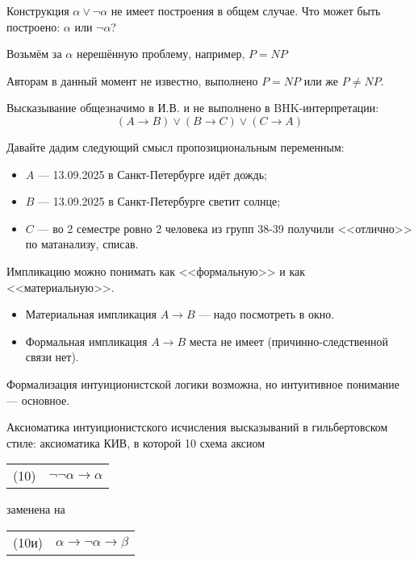 
Конструкция $\alpha\vee\neg\alpha$ не имеет построения в общем случае.
Что может быть построено: $\alpha$ или $\neg\alpha$?

Возьмём за $\alpha$ нерешённую проблему, например, $P = NP$

Авторам в данный момент не известно, выполнено $P = NP$ или же $P \ne NP$.


Высказывание общезначимо в И.В. и не выполнено в BHK-интерпретации:
$$(A \rightarrow B) \vee (B \rightarrow C) \vee (C \rightarrow A)$$

Давайте дадим следующий смысл пропозициональным переменным:
\begin{itemize}
\item $A$ --- 13.09.2025 в Санкт-Петербурге идёт дождь;
\item $B$ --- 13.09.2025 в Санкт-Петербурге светит солнце;
\item $C$ --- во 2 семестре ровно 2 человека из групп 38-39 получили <<отлично>> по матанализу, списав.
\end{itemize}

Импликацию можно понимать как <<формальную>> и как <<материальную>>.
\begin{itemize}
\item Материальная импликация $A\rightarrow B$ --- надо посмотреть в окно.

\item Формальная импликация $A\rightarrow B$ места не имеет (причинно-следственной связи нет).
\end{itemize}

Формализация интуиционистской логики возможна, но интуитивное понимание --- основное.

 Аксиоматика интуиционистского исчисления высказываний в гильбертовском стиле: 
аксиоматика КИВ, в которой 10 схема аксиом

\begin{center}\begin{tabular}{ll}
(10) & $\neg \neg \alpha \rightarrow \alpha$
\end{tabular}\end{center}

заменена на 

\begin{center}\begin{tabular}{ll}
(10и) & $\alpha \rightarrow \neg\alpha \rightarrow \beta$
\end{tabular}\end{center}


